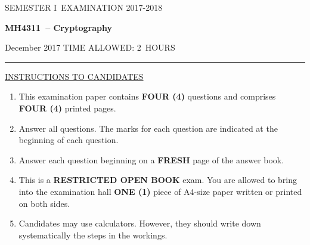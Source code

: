 \documentclass[12pt]{article}
\newcommand{\masunitnumber}{MH4311}
\newcommand{\examdate}{December 2017}
\newcommand{\academicyear}{2017-2018}
\newcommand{\semester}{I}
\newcommand{\coursename}{Cryptography}
\newcommand{\numberofhours}{2}
\begin{document}
\setlength{\headsep}{5truemm}
\setlength{\headheight}{14.5truemm}
\setlength{\voffset}{-0.45truein}
\renewcommand{\headrulewidth}{0.0pt}
\begin{center}
SEMESTER \semester\ EXAMINATION \academicyear
\end{center}
\begin{center}
{\bf \masunitnumber\ -- \coursename}
\end{center}
\vspace{20truemm}

\noindent \examdate\hspace{55truemm} TIME ALLOWED: \numberofhours\ HOURS

\vspace{19truemm}
\hrule
\vspace{19truemm}

\noindent\underline{INSTRUCTIONS TO CANDIDATES}
\vspace{8truemm}
\begin{enumerate}
\item This examination paper contains {\bf FOUR (4)} questions and comprises 
{\bf FOUR (4)} printed pages.

\item Answer all questions. 
The marks for each question are indicated at the beginning of each question.


\item Answer each question beginning on a {\bf FRESH} page of the answer book.

\item This is a {\bf RESTRICTED OPEN BOOK} exam. You are allowed to bring into the examination hall {\bf ONE (1)} piece of A4-size paper written or printed on both sides.

\item Candidates may use calculators. However, they should write down systematically the steps in the workings.
\end{enumerate}

\newpage
\lhead{}
\rhead{\masunitnumber}
\chead{}
\lfoot{}
\cfoot{\thepage}
\rfoot{}
\setlength{\footskip}{45pt}
\end{document}
